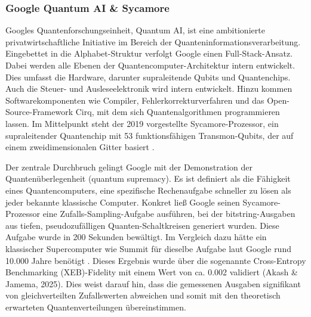\subsubsection*{Google Quantum AI & Sycamore} 

Googles Quantenforschungseinheit, Quantum AI, ist eine ambitionierte privatwirtschaftliche Initiative im Bereich der Quanteninformationsverarbeitung.  Eingebettet in die Alphabet-Struktur verfolgt Google einen Full-Stack-Ansatz. Dabei werden alle Ebenen der Quantencomputer-Architektur intern entwickelt. Dies umfasst die Hardware, darunter supraleitende Qubits und Quantenchips. Auch die Steuer- und Ausleseelektronik wird intern entwickelt. Hinzu kommen Softwarekomponenten wie Compiler, Fehlerkorrekturverfahren und das Open-Source-Framework Cirq, mit dem sich Quantenalgorithmen programmieren lassen. Im Mittelpunkt steht der 2019 vorgestellte Sycamore-Prozessor, ein supraleitender Quantenchip mit 53 funktionsfähigen Transmon-Qubits, der auf einem zweidimensionalen Gitter basiert \cite{aruteQuantumSupremacyUsing2019a}.

Der zentrale Durchbruch gelingt Google mit der Demonstration der Quantenüberlegenheit (quantum supremacy). Es ist definiert als die Fähigkeit eines Quantencomputers, eine spezifische Rechenaufgabe schneller zu lösen als jeder bekannte klassische Computer. Konkret ließ Google seinen Sycamore-Prozessor eine Zufalls-Sampling-Aufgabe ausführen, bei der bitstring-Ausgaben aus tiefen, pseudozufälligen Quanten-Schaltkreisen generiert wurden. Diese Aufgabe wurde in 200 Sekunden bewältigt. Im Vergleich dazu hätte ein klassischer Supercomputer wie Summit für dieselbe Aufgabe laut Google rund 10.000 Jahre benötigt \cite{aruteQuantumSupremacyUsing2019a}. Dieses Ergebnis wurde über die sogenannte Cross-Entropy Benchmarking (XEB)-Fidelity mit einem Wert von ca. 0.002 validiert \cite{}(Akash & Jamema, 2025). Dies weist darauf hin, dass die gemessenen Ausgaben signifikant von gleichverteilten Zufallswerten abweichen und somit mit den theoretisch erwarteten Quantenverteilungen übereinstimmen.

